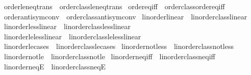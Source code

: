 \begin{isabellebody}
\isamarkupfalse%
\ order{\isacharunderscore}{\kern0pt}le{\isacharunderscore}{\kern0pt}neq{\isacharunderscore}{\kern0pt}trans\ {\isacharequal}{\kern0pt}\ order{\isacharunderscore}{\kern0pt}class{\isachardot}{\kern0pt}le{\isacharunderscore}{\kern0pt}neq{\isacharunderscore}{\kern0pt}trans\isanewline
{}\isamarkupfalse%
\ order{\isacharunderscore}{\kern0pt}eq{\isacharunderscore}{\kern0pt}iff\ {\isacharequal}{\kern0pt}\ order{\isacharunderscore}{\kern0pt}class{\isachardot}{\kern0pt}order{\isachardot}{\kern0pt}eq{\isacharunderscore}{\kern0pt}iff\isanewline
{}\isamarkupfalse%
\ order{\isacharunderscore}{\kern0pt}antisym{\isacharunderscore}{\kern0pt}conv\ {\isacharequal}{\kern0pt}\ order{\isacharunderscore}{\kern0pt}class{\isachardot}{\kern0pt}antisym{\isacharunderscore}{\kern0pt}conv\isanewline
\isanewline
{}\isamarkupfalse%
\ linorder{\isacharunderscore}{\kern0pt}linear\ {\isacharequal}{\kern0pt}\ linorder{\isacharunderscore}{\kern0pt}class{\isachardot}{\kern0pt}linear\isanewline
{}\isamarkupfalse%
\ linorder{\isacharunderscore}{\kern0pt}less{\isacharunderscore}{\kern0pt}linear\ {\isacharequal}{\kern0pt}\ linorder{\isacharunderscore}{\kern0pt}class{\isachardot}{\kern0pt}less{\isacharunderscore}{\kern0pt}linear\isanewline
{}\isamarkupfalse%
\ linorder{\isacharunderscore}{\kern0pt}le{\isacharunderscore}{\kern0pt}less{\isacharunderscore}{\kern0pt}linear\ {\isacharequal}{\kern0pt}\ linorder{\isacharunderscore}{\kern0pt}class{\isachardot}{\kern0pt}le{\isacharunderscore}{\kern0pt}less{\isacharunderscore}{\kern0pt}linear\isanewline
{}\isamarkupfalse%
\ linorder{\isacharunderscore}{\kern0pt}le{\isacharunderscore}{\kern0pt}cases\ {\isacharequal}{\kern0pt}\ linorder{\isacharunderscore}{\kern0pt}class{\isachardot}{\kern0pt}le{\isacharunderscore}{\kern0pt}cases\isanewline
{}\isamarkupfalse%
\ linorder{\isacharunderscore}{\kern0pt}not{\isacharunderscore}{\kern0pt}less\ {\isacharequal}{\kern0pt}\ linorder{\isacharunderscore}{\kern0pt}class{\isachardot}{\kern0pt}not{\isacharunderscore}{\kern0pt}less\isanewline
{}\isamarkupfalse%
\ linorder{\isacharunderscore}{\kern0pt}not{\isacharunderscore}{\kern0pt}le\ {\isacharequal}{\kern0pt}\ linorder{\isacharunderscore}{\kern0pt}class{\isachardot}{\kern0pt}not{\isacharunderscore}{\kern0pt}le\isanewline
{}\isamarkupfalse%
\ linorder{\isacharunderscore}{\kern0pt}neq{\isacharunderscore}{\kern0pt}iff\ {\isacharequal}{\kern0pt}\ linorder{\isacharunderscore}{\kern0pt}class{\isachardot}{\kern0pt}neq{\isacharunderscore}{\kern0pt}iff\isanewline
{}\isamarkupfalse%
\ linorder{\isacharunderscore}{\kern0pt}neqE\ {\isacharequal}{\kern0pt}\ linorder{\isacharunderscore}{\kern0pt}class{\isachardot}{\kern0pt}neqE\isanewline
%
\isadelimtheory
\isanewline
%
\endisadelimtheory
%
\isatagtheory
{}\isamarkupfalse%
%
\endisatagtheory
{\isafoldtheory}%
%
\isadelimtheory
%
\endisadelimtheory
%
\end{isabellebody}%
